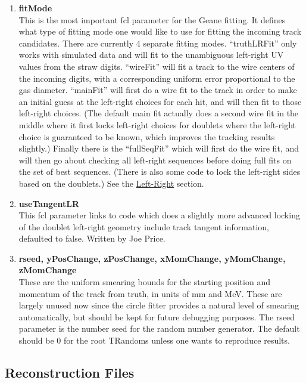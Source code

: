 \begin{enumerate}
      \item{\bf{fitMode}} \\
      This is the most important fcl parameter for the Geane fitting. It defines what type of fitting mode one would like to use for fitting the incoming track candidates. There are currently 4 separate fitting modes. ``truthLRFit'' only works with simulated data and will fit to the unambiguous left-right UV values from the straw digits. ``wireFit'' will fit a track to the wire centers of the incoming digits, with a corresponding uniform error proportional to the gas diameter. ``mainFit'' will first do a wire fit to the track in order to make an initial guess at the left-right choices for each hit, and will then fit to those left-right choices. (The default main fit actually does a second wire fit in the middle where it first locks left-right choices for doublets where the left-right choice is guaranteed to be known, which improves the tracking results slightly.) Finally there is the ``fullSeqFit'' which will first do the wire fit, and will then go about checking all left-right sequences before doing full fits on the set of best sequences. (There is also some code to lock the left-right sides based on the doublets.) See the \hyperref[sec:LR]{Left-Right} section.

      \item{\bf{useTangentLR}} \\
      This fcl parameter links to code which does a slightly more advanced locking of the doublet left-right geometry include track tangent information, defaulted to false. Written by Joe Price.

      \item{\bf{rseed, yPosChange, zPosChange, xMomChange, yMomChange, zMomChange}} \\
      These are the uniform smearing bounds for the starting position and momentum of the track from truth, in units of mm and MeV. These are largely unused now since the circle fitter provides a natural level of smearing automatically, but should be kept for future debugging purposes. The rseed parameter is the number seed for the random number generator. The default should be 0 for the root TRandoms unless one wants to reproduce results.

    \end{enumerate}


  \subsection{Reconstruction Files}

